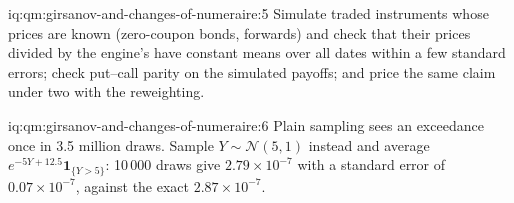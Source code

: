 \begin{solution}{iq:qm:girsanov-and-changes-of-numeraire:5}
Simulate traded instruments whose prices are known (zero-coupon bonds, forwards) and check that
their prices divided by the engine's  have constant means over all dates within a few
standard errors; check put--call parity on the simulated payoffs; and price the same claim under two
 with the reweighting.
\end{solution}

\begin{solution}{iq:qm:girsanov-and-changes-of-numeraire:6}
Plain sampling sees an exceedance once in 3.5 million draws. Sample $Y \sim \mathcal N(5, 1)$ instead and average
$e^{-5Y + 12.5}\mathbf 1_{\{Y > 5\}}$: 10\,000 draws give $2.79 \times 10^{-7}$ with a standard error of
$0.07 \times 10^{-7}$, against the exact $2.87 \times 10^{-7}$.
\end{solution}
